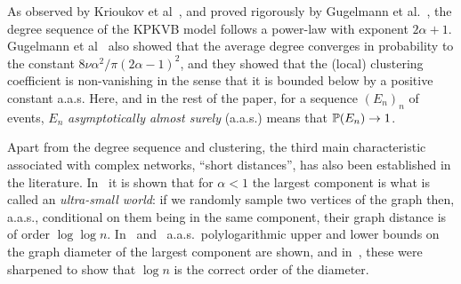 As observed by Krioukov et al~\cite{krioukov2010hyperbolic}, and proved rigorously by Gugelmann et al.~\cite{gugelmann2012random}, the degree sequence of the KPKVB model follows a power-law with exponent $2\alpha+1$.
% 
% 
%
%
Gugelmann et al~\cite{gugelmann2012random} also showed that the average degree converges in probability to the constant $8\nu\alpha^2/ \pi (2\alpha-1)^2$, and they showed that the (local) clustering coefficient is non-vanishing in the sense that it is bounded below by a positive constant a.a.s. Here, and in the rest of the paper, for a sequence $(E_n)_n$ of events, $E_n$ {\em asymptotically almost surely} (a.a.s.) means that $\mathbb{P}(E_n)\to 1$.

Apart from the degree sequence and clustering, the third main characteristic associated with complex networks, ``short distances'', has also been established in the literature. In~\cite{abdullah2017typical} it is shown that for $\alpha < 1$ the largest component is what is called an \emph{ultra-small world}: if we randomly sample two vertices of the graph then, a.a.s., conditional on them being in the same component, their graph distance is of order $\log\log n$. In~\cite{KiwiMit} and~\cite{ar:FriedKrohmerDiam} a.a.s.~polylogarithmic upper and lower bounds on the graph diameter of the largest component 
are shown, and in~\cite{ar:MullerDiam}, these were sharpened to show that $\log n$ is the correct order of the diameter.


